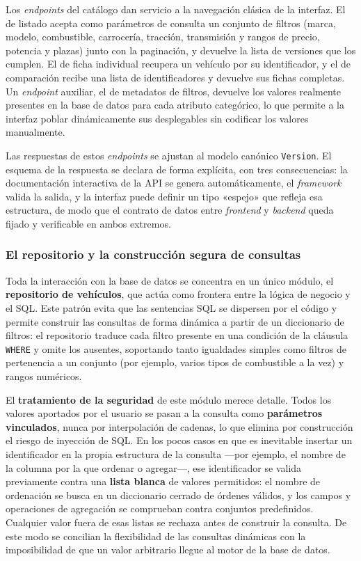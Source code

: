 Los \emph{endpoints} del catálogo dan servicio a la navegación clásica de la
interfaz. El de listado acepta como parámetros de consulta un conjunto de
filtros (marca, modelo, combustible, carrocería, tracción, transmisión y rangos
de precio, potencia y plazas) junto con la paginación, y devuelve la lista de
versiones que los cumplen. El de ficha individual recupera un vehículo por su
identificador, y el de comparación recibe una lista de identificadores y devuelve
sus fichas completas. Un \emph{endpoint} auxiliar, el de metadatos de filtros,
devuelve los valores realmente presentes en la base de datos para cada atributo
categórico, lo que permite a la interfaz poblar dinámicamente sus desplegables
sin codificar los valores manualmente.

Las respuestas de estos \emph{endpoints} se ajustan al modelo canónico
\texttt{Version}. El esquema de la respuesta se declara de forma explícita, con
tres consecuencias: la documentación interactiva de la API se genera
automáticamente, el \emph{framework} valida la salida, y la interfaz puede definir
un tipo «espejo» que refleja esa estructura, de modo que el contrato de datos
entre \emph{frontend} y \emph{backend} queda fijado y verificable en ambos
extremos.

\subsubsection*{El repositorio y la construcción segura de consultas}

Toda la interacción con la base de datos se concentra en un único módulo, el
\textbf{repositorio de vehículos}, que actúa como frontera entre la lógica de
negocio y el SQL. Este patrón evita que las sentencias SQL se dispersen por el
código y permite construir las consultas de forma dinámica a partir de un
diccionario de filtros: el repositorio traduce cada filtro presente en una
condición de la cláusula \texttt{WHERE} y omite los ausentes, soportando tanto
igualdades simples como filtros de pertenencia a un conjunto (por ejemplo, varios
tipos de combustible a la vez) y rangos numéricos.

El \textbf{tratamiento de la seguridad} de este módulo merece detalle. Todos los
valores aportados por el usuario se pasan a la consulta como \textbf{parámetros
vinculados}, nunca por interpolación de cadenas, lo que elimina por construcción
el riesgo de inyección de SQL. En los pocos casos en que es inevitable insertar
un identificador en la propia estructura de la consulta
—por ejemplo, el nombre de la columna por la que ordenar o agregar—, ese
identificador se valida previamente contra una \textbf{lista blanca} de valores
permitidos: el nombre de ordenación se busca en un diccionario cerrado de
órdenes válidos, y los campos y operaciones de agregación se comprueban contra
conjuntos predefinidos. Cualquier valor fuera de esas listas se rechaza antes de
construir la consulta. De este modo se concilian la flexibilidad de las consultas
dinámicas con la imposibilidad de que un valor arbitrario llegue al motor de la
base de datos.

